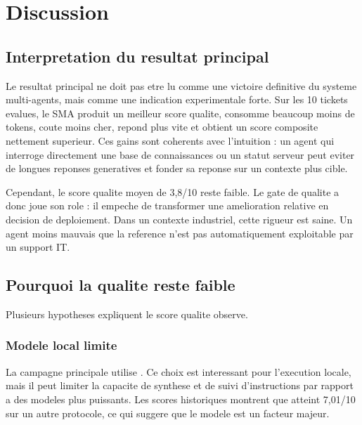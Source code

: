 
\chapter{Discussion}

\section{Interpretation du resultat principal}

Le resultat principal ne doit pas etre lu comme une victoire definitive du
systeme multi-agents, mais comme une indication experimentale forte. Sur les
10 tickets evalues, le SMA produit un meilleur score qualite, consomme beaucoup
moins de tokens, coute moins cher, repond plus vite et obtient un score
composite nettement superieur. Ces gains sont coherents avec l'intuition : un
agent qui interroge directement une base de connaissances ou un statut serveur
peut eviter de longues reponses generatives et fonder sa reponse sur un contexte
plus cible.

Cependant, le score qualite moyen de 3,8/10 reste faible. Le gate de qualite a
donc joue son role : il empeche de transformer une amelioration relative en
decision de deploiement. Dans un contexte industriel, cette rigueur est saine.
Un agent moins mauvais que la reference n'est pas automatiquement exploitable par
un support IT.

\section{Pourquoi la qualite reste faible}

Plusieurs hypotheses expliquent le score qualite observe.

\subsection{Modele local limite}

La campagne principale utilise . Ce choix est interessant pour
l'execution locale, mais il peut limiter la capacite de synthese et de suivi
d'instructions par rapport a des modeles plus puissants. Les scores historiques
montrent que  atteint 7,01/10 sur un autre protocole, ce qui
suggere que le modele est un facteur majeur.

